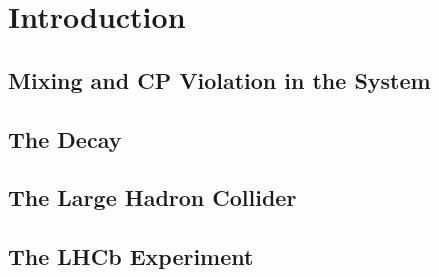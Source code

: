 \chapter{Introduction}



\section{Mixing and CP Violation in the \texorpdfstring{\BsBsbar{}}{Bs0-Bs0bar} System}
\label{sec:introMixing}
\section{The \texorpdfstring{\BstoJpsiphi{}}{Bs0->Jpsiphi} Decay}
\label{sec:introDecay}
\section{The Large Hadron Collider}
\section{The LHCb Experiment}

